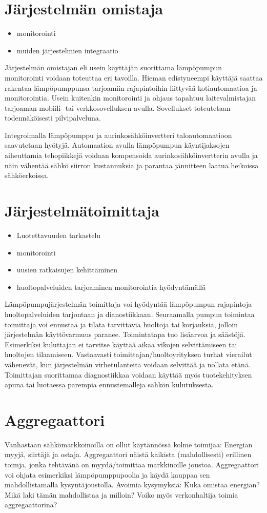 \section{Järjestelmän omistaja}
  \begin{itemize}
    \item monitorointi
    \item muiden järjestelmien integraatio
  \end{itemize}

  Järjestelmän omistajan eli usein käyttäjän suorittama lämpöpumpun monitorointi voidaan toteuttaa eri tavoilla. Hieman edistyneempi käyttäjä saattaa rakentaa lämpöpumppunsa tarjoamiin rajapintoihin liittyvää kotiautomaatioa ja monitorointia. Usein kuitenkin monitorointi ja ohjaus tapahtuu laitevalmistajan tarjoaman mobiili- tai verkkosovelluksen avulla. Sovellukset toteutetaan todennäköisesti pilvipalveluna.

  Integroimalla lämpöpumppu ja aurinkosähköinvertteri taloautomaatioon saavutetaan hyötyjä. Automaation avulla lämpöpumpun käyntijaksojen aiheuttamia tehopiikkejä voidaan kompensoida aurinkosähköinvertterin avulla ja näin vähentää sähkö siirron kustannuksia ja parantaa jännitteen laatua heikoissa sähköerkoissa.

\section{Järjestelmätoimittaja}
  \begin{itemize}
    \item Luotettavuuden tarkastelu
    \item monitorointi
    \item uusien ratkaisujen kehittäminen
    \item huoltopalveluiden tarjoaminen monitorointia hyödyntämällä
  \end{itemize}

  Lämpöpumpujärjestelmän toimittaja voi hyödyntää lämpöpumpun rajapintoja huoltopalveluiden tarjontaan ja dianostiikkaan. Seuraamalla pumpun toimintaa toimittaja voi ennustaa ja tilata tarvittavia huoltoja tai korjauksia, jolloin järjestelmän käyttövarmuus paranee. Toimintatapa tuo lisäarvoa ja säästöjä. Esimerkiksi kuluttajan ei tarvitse käyttää aikaa vikojen selvittämiseen tai huoltojen tilaamiseen. Vastaavasti toimittajan/huoltoyrityksen turhat vierailut vähenevät, kun järjestelmän virhetulanteita voidaan selvittää ja nollata etänä. Toimittajan suorittamaa diagnostiikkaa voidaan käyttää myös tuotekehityksen apuna tai luotaessa parempia ennustemalleja sähkön kulutuksesta.

  \section{Aggregaattori}

    Vanhastaan sähkömarkkoinoilla on ollut käytännössä kolme toimijaa: Energian myyjä, siirtäjä ja ostaja. Aggregaattori näistä kaikista (mahdollisesti) erillinen toimja, jonka tehtävänä on myydä/toimittaa markkinoille joustoa. Aggregaattori voi ohjata esimerkiksi lämpöpumppupoolia ja käydä kauppaa sen mahdollistamalla kysyntäjoustolla. Avoimia kysymyksiä: Kuka omistaa energian? Ḿikä laki tämän mahdollistaa ja milloin? Voiko myös verkonhaltija toimia aggregaattorina?
